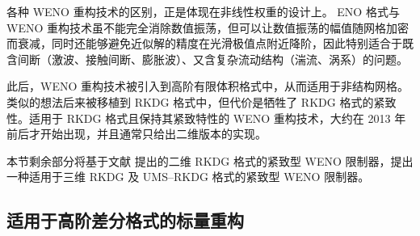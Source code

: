 各种 WENO 重构技术的区别，正是体现在非线性权重的设计上。 ENO 格式与 WENO 重构技术虽不能完全消除数值振荡，但可以让数值振荡的幅值随网格加密而衰减，同时还能够避免近似解的精度在光滑极值点附近降阶，因此特别适合于既含间断（激波、接触间断、膨胀波）、又含复杂流动结构（湍流、涡系）的问题。

此后，WENO 重构技术被引入到高阶有限体积格式中，从而适用于非结构网格。类似的想法后来被移植到 RKDG
格式中，但代价是牺牲了 RKDG 格式的紧致性。适用于 RKDG 格式且保持其紧致特性的
WENO 重构技术，大约在 2013 年前后才开始出现，并且通常只给出二维版本的实现。

本节剩余部分将基于文献 \cite{Zhong_2013,Zhu_2013} 提出的二维 RKDG 格式的紧致型 WENO 限制器，提出一种适用于三维
RKDG 及 UMS–RKDG 格式的紧致型 WENO 限制器。

\subsection{适用于高阶差分格式的标量重构}


